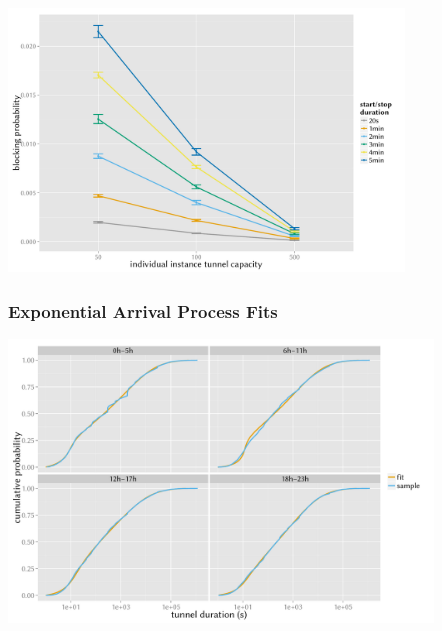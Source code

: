 \documentclass{beamer}
\begin{document}
\appendix
{}
\setcounter{finalframe}{\value{framenumber}}

\begin{frame}
\end{frame}




\begin{frame}
	\frametitle{}
	\begin{center}
		\includegraphics[height=7cm]{../../chapters/04-mobilenets/images/compare-maxinstances-block.pdf}
	\end{center}
\end{frame}


\begin{frame}
	\frametitle{Exponential Arrival Process Fits}

	\begin{center}
		\includegraphics[height=7.5cm]{../../chapters/04-mobilenets/images/R-duration-fit-cdf-facets.pdf}
	\end{center}
\end{frame}
\end{document}
